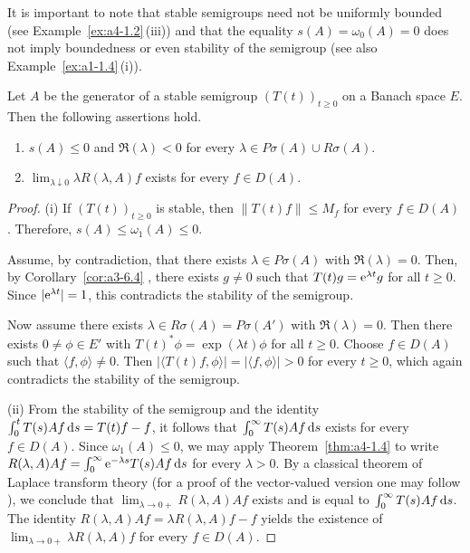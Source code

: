 It is important to note  that stable semigroups need not be uniformly bounded (see Example~\ref{ex:a4-1.2}\,(iii)) and that the equality $ s(A) = \omega_{0}(A) = 0 $ does not imply boundedness or even stability of the semigroup (see also Example~\ref{ex:a1-1.4}\,(i)).
\begin{theorem} \label{thm:a4-1.13} 
Let $ A $ be the generator of a stable semigroup $ (T(t))_{t \geq 0} $ on a Banach space $ E $. Then the following assertions hold.
\begin{enumerate}[\upshape (i)]
    \item 
    $ s(A) \leq 0 $ and $ \Re(\lambda) < 0 $ for every $ \lambda \in P\sigma (A) \cup R\sigma(A) $.
    
    \item 
    $ \lim_{\lambda \downarrow 0} \lambda R(\lambda, A) f $ exists for every $ f \in D(A) $.
\end{enumerate}
\end{theorem}
\begin{proof} (i) If\/ $ (T(t))_{t \geq 0} $ is stable, then $ \|T(t) f\| \leq M_f $ for every $ f \in D(A) $. Therefore, $ s(A) \leq \omega_1(A) \leq 0 $. 

Assume, by contradiction, that there exists $ \lambda \in P\sigma(A) $ with $ \Re(\lambda) = 0 $. 
Then, by Corollary~\ref{cor:a3-6.4} , there exists $ g \neq 0 $ such that $ T(t) g = \mathrm{e}^{\lambda t} g $ for all $ t \geq 0 $. Since $ |\mathrm{e}^{\lambda t}| = 1 $, this contradicts the stability of the semigroup. 

Now assume there exists $ \lambda \in R\sigma(A) = P\sigma(A') $ with $ \Re(\lambda) = 0 $. 
Then there exists $ 0 \neq \phi \in E' $ with $ T(t)^* \phi = \exp(\lambda t) \phi $ for all $ t \geq 0 $. Choose $ f \in D(A) $ such that $ \langle f, \phi \rangle \neq 0 $. 
Then $ |\langle T(t) f, \phi \rangle| = | \langle f, \phi \rangle| > 0 $ for every $ t \geq 0 $, which again contradicts the stability of the semigroup.

(ii) From the stability of the semigroup and the identity   $\int_{0}^{t} T(s) A f  \mathop{}\!\mathrm{d}{s} = T(t) f - f$, it follows that  
$\int_{0}^{\infty} T(s) A f  \mathop{}\!\mathrm{d}{s}$ exists for every $ f \in D(A) $.  
Since $ \omega_1(A) \leq 0 $, we may apply Theorem~\ref{thm:a4-1.4} to write  $ R(\lambda, A) A f = \int_{0}^{\infty} \mathrm{e}^{-\lambda s} T(s) A f  \mathop{}\!\mathrm{d}{s} $ for every $ \lambda > 0 $. 
By a classical theorem of Laplace transform theory (for a proof of the vector-valued version one may follow \textcite[p.~196]{widder:1971}), we conclude that $\lim_{\lambda \to 0+} R(\lambda,A)Af$ exists
and is equal to $\int_{0}^{\infty} T(s)Af  \mathop{}\!\mathrm{d}{s}$. 
The identity $R(\lambda,A)Af = \lambda R(\lambda,A)f - f$
yields the existence of\/ $\lim_{\lambda \to 0+} \lambda R(\lambda,A)f$ for every $f \in D(A)$.
\end{proof}


